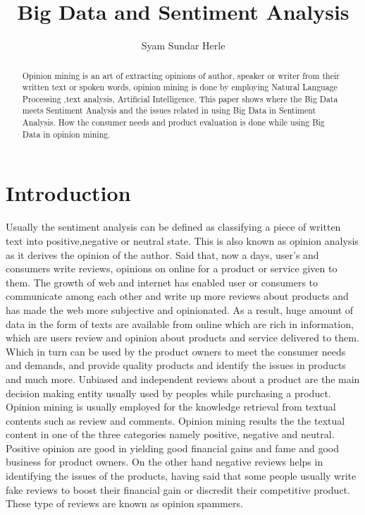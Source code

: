 \documentclass[sigconf]{acmart}
\begin{document}
\title{Big Data and Sentiment Analysis}
\author{Syam Sundar Herle}

\begin{abstract}
Opinion mining is an art of extracting opinions of author, speaker or writer from their written text or spoken words, opinion mining is done by employing Natural Language Processing ,text analysis, Artificial Intelligence. This paper shows where the Big Data meets Sentiment Analysis and the issues related in using Big Data in Sentiment Analysis. How the consumer needs and product evaluation is done while using Big Data in opinion mining. 
\end{abstract}


\maketitle
\section{Introduction}

Usually the sentiment analysis can be defined as classifying a piece of written text into positive,negative or neutral state. This is also known as opinion analysis as it derives the opinion of the author. Said that, now a days, user's and consumers write reviews, opinions on online for a product or service given to them. The growth of web and internet has enabled user or consumers to communicate among each other and write up more reviews about products and has made the web more subjective and opinionated. As a result, huge amount of data in the form of texts are available from online which are rich in information, which are users review and opinion about products and service delivered to them. Which in turn can be used by the product owners to meet the consumer needs and demands, and provide quality products and identify the issues in products and much more. Unbiased and independent reviews about a product are the main decision making entity usually used by peoples while purchasing a product. 
Opinion mining is usually employed for the knowledge retrieval from textual contents such as review and comments. Opinion mining results the the textual content in one of the three categories namely positive, negative and neutral. Positive opinion are good in yielding good financial gains and fame and good business for product owners. On the other hand negative reviews helps in identifying the issues of the products, having said that some people usually write fake reviews to boost their financial gain or discredit their competitive product. These type of reviews are known as opinion spammers.
\end{document}
